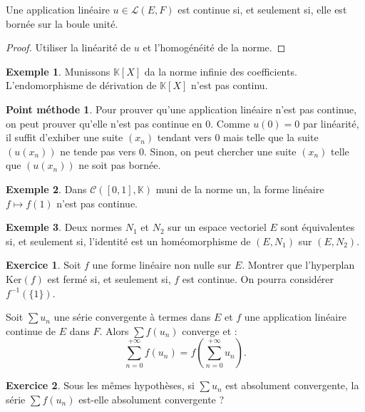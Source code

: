 \documentclass[french]{article}
\newcommand{\K}{\mathbb{K}}
\newcommand{\inv}{^{-1}}
\renewcommand{\ker}{\text{Ker}}
\theoremstyle{plain}
\theoremstyle{definition}
\newtheorem*{ex}{Exemple}
\newtheorem*{met}{Point méthode}
\newtheorem{exo}{Exercice}
\theoremstyle{remark}
\begin{document}
\begin{thm}{}%
	Une application linéaire $u\in\mathcal{L}(E,F)$ est continue si, et seulement si, elle est bornée sur la boule unité.
\end{thm}
\begin{proof}
	Utiliser la linéarité de $u$ et l'homogénéité de la norme.
\end{proof}

\begin{ex}
	Munissons $\K[X]$ da la norme infinie des coefficients. L'endomorphisme de dérivation de $\K[X]$ n'est pas continu. %
\end{ex}

\begin{met}
	Pour prouver qu'une application linéaire n'est pas continue, on peut prouver qu'elle n'est pas continue en $0$. Comme $u(0)=0$ par linéarité, il suffit d'exhiber une suite $(x_n)$ tendant vers $0$ mais telle que la suite $(u(x_n))$ ne tende pas vers $0$. Sinon, on peut chercher une suite $(x_n)$ telle que $(u(x_n))$ ne soit pas bornée.
\end{met}

\begin{ex}
	Dans $\mathcal{C}([0,1],\K)$ muni de la norme un, la forme linéaire $f\mapsto f(1)$ n'est pas continue. %
\end{ex}

\begin{ex}
	Deux normes $N_1$ et $N_2$ sur un espace vectoriel $E$ sont équivalentes si, et seulement si, l'identité est un homéomorphisme de $(E,N_1)$ sur $(E,N_2)$.
\end{ex}

\begin{exo}
	Soit $f$ une forme linéaire non nulle sur $E$. Montrer que l'hyperplan $\ker(f)$ est fermé si, et seulement si, $f$ est continue. On pourra considérer $f\inv(\{1\})$.
\end{exo}

\begin{thm}{}%
	Soit $\displaystyle\sum u_n$ une série convergente à termes dans $E$ et $f$ une application linéaire continue de $E$ dans $F$. Alors $\displaystyle\sum f(u_n)$ converge et : $$\sum_{n=0}^{+\infty}f(u_n)=f\left(\sum_{n=0}^{+\infty}u_n\right).$$
\end{thm}

\begin{exo}
	Sous les mêmes hypothèses, si $\displaystyle\sum u_n$ est absolument convergente, la série $\displaystyle\sum f(u_n)$ est-elle absolument convergente ?
\end{exo}
\end{document}
